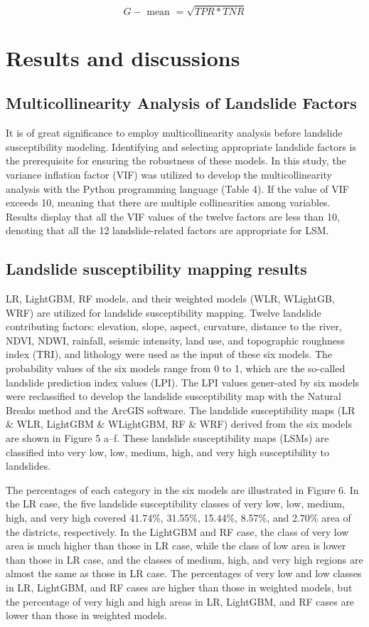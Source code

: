 \documentclass[a4paper,fleqn]{cas-sc}
\begin{document}
\begin{equation}
  G-\text { mean }=\sqrt{T P R * T N R}
  \label{eqn:G_mean}
\end{equation}

\section{Results and discussions}
\subsection{Multicollinearity Analysis of Landslide Factors}

It is of great significance to employ multicollinearity analysis before landslide susceptibility modeling. 
Identifying and selecting appropriate landslide factors is the prerequisite for ensuring the robustness of these models. 
In this study, the variance inflation factor (VIF) was utilized to develop the multicollinearity analysis with the Python programming language (Table 4). 
If the value of VIF exceeds 10, meaning that there are multiple collinearities among variables. 
Results display that all the VIF values of the twelve factors are less than 10, denoting that all the 12 landslide-related factors are appropriate for LSM.

\subsection{Landslide susceptibility mapping results}

LR, LightGBM, RF models, and their weighted models (WLR, WLightGB, WRF) are utilized for landslide susceptibility mapping. 
Twelve landslide contributing factors: elevation, slope, aspect, curvature, distance to the river, NDVI, NDWI, rainfall, seismic intensity, land use, and topographic roughness index (TRI), and lithology were used as the input of these six models. 
The probability values of the six models range from 0 to 1, which are the so-called landslide prediction index values (LPI). 
The LPI values gener-ated by six models were reclassified to develop the landslide susceptibility map with the Natural Breaks method and the ArcGIS software. 
The landslide susceptibility maps (LR \& WLR, LightGBM \& WLightGBM, RF \& WRF) derived from the six models are shown in Figure 5 a–f. 
These landslide susceptibility maps (LSMs) are classified into very low, low, medium, high, and very high susceptibility to landslides. 

The percentages of each category in the six models are illustrated in Figure 6. 
In the LR case, the five landslide susceptibility classes of very low, low, medium, high, and very high covered 41.74\%, 31.55\%, 15.44\%, 8.57\%, and 2.70\% area of the districts, respectively. 
In the LightGBM and RF case, the class of very low area is much higher than those in LR case, while the class of low area is lower than those in LR case, and the classes of medium, high, and very high regions are almost the same as those in LR case. 
The percentages of very low and low classes in LR, LightGBM, and RF cases are higher than those in weighted models, but the percentage of very high and high areas in LR, LightGBM, and RF cases are lower than those in weighted models.
\end{document}
